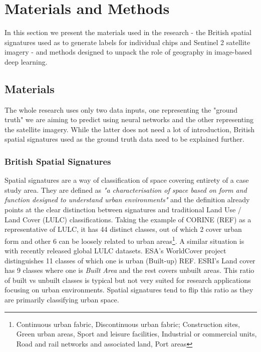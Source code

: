\section{Materials and Methods}
\label{sec:matmet}

In this section we present the materials used in the research - the British spatial signatures used as to generate labels for individual chips and Sentinel 2 satellite imagery - and methods designed to unpack the role of geography in image-based deep learning.

\subsection{Materials}

The whole research uses only two data inputs, one representing the "ground truth" we are aiming to predict using neural networks and the other representing the satellite imagery. While the latter does not need a lot of introduction, British spatial signatures used as the ground truth data need to be explained further.

\subsubsection{British Spatial Signatures}

Spatial signatures are a way of classification of space covering entirety of a case study area. They are defined as \textit{"a characterisation of space based on form and function designed to understand urban environments"} \citep{dab_mf_2021a} and the definition already points at the clear distinction between signatures and traditional Land Use / Land Cover (LULC) classifications. Taking the example of CORINE (REF) as a representative of LULC, it has 44 distinct classes, out of which 2 cover urban form and other 6 can be loosely related to urban areas\footnote{Continuous urban fabric, Discontinuous urban fabric; Construction sites, Green urban areas, Sport and leisure facilities, Industrial or commercial units, Road and rail networks and associated land, Port areas}. A similar situation is with recently released global LULC datasets. ESA's WorldCover project distinguishes 11 classes of which one is urban (Built-up) REF. ESRI's Land cover has 9 classes where one is \textit{Built Area} and the rest covers unbuilt areas. This ratio of built vs unbuilt classes is typical but not very suited for research applications focusing on urban environments. Spatial signatures tend to flip this ratio as they are primarily classifying urban space.

